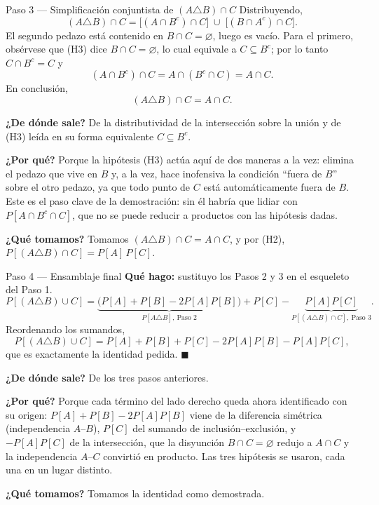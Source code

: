 \documentclass[11pt]{article}
\begin{document}
\begin{sol}
\begin{paso}{Paso 3 --- Simplificaci\'on conjuntista de $(A\triangle B)\cap C$}
Distribuyendo,
\[
(A\triangle B)\cap C=\bigl[(A\cap B^{c})\cap C\bigr]\;\cup\;\bigl[(B\cap A^{c})\cap C\bigr].
\]
El segundo pedazo est\'a contenido en $B\cap C=\varnothing$, luego es vac\'io. Para el primero, obs\'ervese que (H3) dice $B\cap C=\varnothing$, lo cual equivale a $C\subseteq B^{c}$; por lo tanto $C\cap B^{c}=C$ y
\[
(A\cap B^{c})\cap C=A\cap(B^{c}\cap C)=A\cap C .
\]
En conclusi\'on,
\[
(A\triangle B)\cap C=A\cap C .
\]

\textbf{¿De d\'onde sale?} De la distributividad de la intersecci\'on sobre la uni\'on y de (H3) le\'ida en su forma equivalente $C\subseteq B^{c}$.

\textbf{¿Por qu\'e?} Porque la hip\'otesis (H3) act\'ua aqu\'i de dos maneras a la vez: elimina el pedazo que vive en $B$ y, a la vez, hace inofensiva la condici\'on ``fuera de $B$'' sobre el otro pedazo, ya que todo punto de $C$ est\'a autom\'aticamente fuera de $B$. Este es el paso clave de la demostraci\'on: sin \'el habr\'ia que lidiar con $P[A\cap B^{c}\cap C]$, que no se puede reducir a productos con las hip\'otesis dadas.

\textbf{¿Qu\'e tomamos?} Tomamos $(A\triangle B)\cap C=A\cap C$, y por (H2), $P[(A\triangle B)\cap C]=P[A]\,P[C]$.
\end{paso}

\begin{paso}{Paso 4 --- Ensamblaje final}
\textbf{Qu\'e hago:} sustituyo los Pasos 2 y 3 en el esqueleto del Paso 1.
\[
P[(A\triangle B)\cup C]
= \underbrace{\bigl(P[A]+P[B]-2P[A]P[B]\bigr)}_{P[A\triangle B],\ \text{Paso 2}}
+ P[C]
- \underbrace{P[A]P[C]}_{P[(A\triangle B)\cap C],\ \text{Paso 3}} .
\]
Reordenando los sumandos,
\[
P[(A\triangle B)\cup C]=P[A]+P[B]+P[C]-2P[A]P[B]-P[A]P[C],
\]
que es exactamente la identidad pedida. $\blacksquare$

\textbf{¿De d\'onde sale?} De los tres pasos anteriores.

\textbf{¿Por qu\'e?} Porque cada t\'ermino del lado derecho queda ahora identificado con su origen: $P[A]+P[B]-2P[A]P[B]$ viene de la diferencia sim\'etrica (independencia $A$--$B$), $P[C]$ del sumando de inclusi\'on--exclusi\'on, y $-P[A]P[C]$ de la intersecci\'on, que la disyunci\'on $B\cap C=\varnothing$ redujo a $A\cap C$ y la independencia $A$--$C$ convirti\'o en producto. Las tres hip\'otesis se usaron, cada una en un lugar distinto.

\textbf{¿Qu\'e tomamos?} Tomamos la identidad como demostrada.
\end{paso}

\end{sol}
\end{document}
